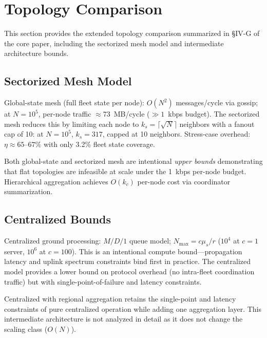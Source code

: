 \documentclass[journal]{IEEEtran}
\begin{document}
\section{Topology Comparison}
\label{sec:supp-topology}

This section provides the extended topology comparison summarized in \S IV-G of the core paper, including the sectorized mesh model and intermediate architecture bounds.

\subsection{Sectorized Mesh Model}

Global-state mesh (full fleet state per node): $O(N^2)$ messages/cycle via gossip; at $N = 10^5$, per-node traffic $\approx 73$~MB/cycle ($\gg 1$~kbps budget). The sectorized mesh reduces this by limiting each node to $k_s = \lceil\sqrt{N}\rceil$ neighbors with a fanout cap of 10: at $N = 10^5$, $k_s = 317$, capped at 10 neighbors. Stress-case overhead: $\eta \approx 65$--$67\%$ with only 3.2\% fleet state coverage.

Both global-state and sectorized mesh are intentional \emph{upper bounds} demonstrating that flat topologies are infeasible at scale under the 1~kbps per-node budget. Hierarchical aggregation achieves $O(k_c)$ per-node cost via coordinator summarization.

\subsection{Centralized Bounds}

Centralized ground processing: $M/D/1$ queue model; $N_{\text{max}} = c \mu_s / r$ ($10^4$ at $c = 1$ server, $10^6$ at $c = 100$). This is an intentional compute bound---propagation latency and uplink spectrum constraints bind first in practice. The centralized model provides a lower bound on protocol overhead (no intra-fleet coordination traffic) but with single-point-of-failure and latency constraints.

Centralized with regional aggregation retains the single-point and latency constraints of pure centralized operation while adding one aggregation layer. This intermediate architecture is not analyzed in detail as it does not change the scaling class ($O(N)$).
\end{document}
